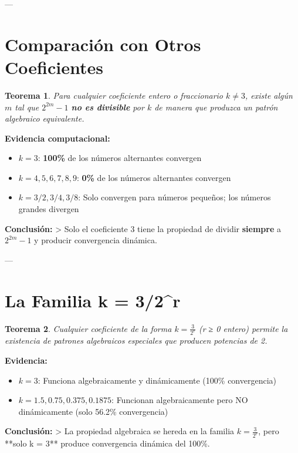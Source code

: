\documentclass[11pt,a4paper]{article}
\newtheorem{theorem}{Teorema}[section]
\begin{document}
---

\section{Comparación con Otros Coeficientes}

\begin{theorem}
Para cualquier coeficiente entero o fraccionario \( k \neq 3 \), existe algún \( m \) tal que \( 2^{2m} - 1 \) \textbf{no es divisible} por \( k \) de manera que produzca un patrón algebraico equivalente.
\end{theorem}

\textbf{Evidencia computacional:}
\begin{itemize}
    \item \( k = 3 \): \textbf{100\%} de los números alternantes convergen
    \item \( k = 4, 5, 6, 7, 8, 9 \): \textbf{0\%} de los números alternantes convergen
    \item \( k = 3/2, 3/4, 3/8 \): Solo convergen para números pequeños; los números grandes divergen
\end{itemize}

\textbf{Conclusión:}
> Solo el coeficiente 3 tiene la propiedad de dividir \textbf{siempre} a \( 2^{2m} - 1 \) y producir convergencia dinámica.

---

\section{La Familia k = 3/2^r}

\begin{theorem}
Cualquier coeficiente de la forma \( k = \frac{3}{2^r} \) (r ≥ 0 entero) permite la existencia de patrones algebraicos especiales que producen potencias de 2.
\end{theorem}

\textbf{Evidencia:}
\begin{itemize}
    \item \( k = 3 \): Funciona algebraicamente y dinámicamente (100\% convergencia)
    \item \( k = 1.5, 0.75, 0.375, 0.1875 \): Funcionan algebraicamente pero NO dinámicamente (solo 56.2\% convergencia)
\end{itemize}

\textbf{Conclusión:}
> La propiedad algebraica se hereda en la familia \( k = \frac{3}{2^r} \), pero **solo k = 3** produce convergencia dinámica del 100\%.
\end{document}
